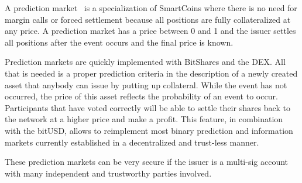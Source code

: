 A prediction market~\cite{wiki_pm} is a specialization of SmartCoins where
there is no need for margin calls or forced settlement because all positions
are fully collateralized at any price. A prediction market has a price between
0 and 1 and the issuer settles all positions after the event occurs and the
final price is known.

Prediction markets are quickly implemented with BitShares and the DEX. All that
is needed is a proper prediction criteria in the description of a newly created
asset that anybody can issue by putting up collateral. While the event has not
occurred, the price of this asset reflects the probability of an event to
occur. Participants that have voted correctly will be able to settle their
shares back to the network at a higher price and make a profit. This feature,
in combination with the bitUSD, allows to reimplement most binary prediction
and information markets currently established in a decentralized and trust-less
manner.

These prediction markets can be very secure if the issuer is a multi-sig
account with many independent and trustworthy parties involved.
